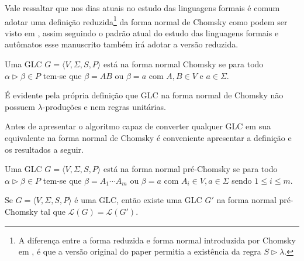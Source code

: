 Vale ressaltar que nos dias atuais no estudo das linguagens formais é comum adotar uma definição reduzida\footnote{A diferença entre a forma reduzida e forma normal introduzida por Chomsky em \cite{chomsky1959}, é que a versão original do paper permitia a existência da regra $S \rhd \lambda$.} da forma normal de Chomsky como podem ser visto em \cite{benjaLivro2010, hopcroft2008, menezes1998LFA}, assim seguindo o padrão atual do estudo das linguagens formais e autômatos esse manuscrito também irá adotar a versão reduzida.

\begin{definition}\label{def:NormalChomsky}
    Uma GLC $G = \langle V, \Sigma, S, P \rangle$ está na forma normal Chomsky se para todo $\alpha \rhd \beta \in P$ tem-se que $\beta = AB$ ou $\beta = a$ com $A, B \in V$ e $a \in \Sigma$.
\end{definition}

\begin{remark}
    É evidente pela própria definição que GLC na forma normal de Chomsky não possuem $\lambda$-produções e nem regras unitárias.
\end{remark}

Antes de apresentar o algoritmo capaz de converter qualquer GLC em sua equivalente na forma normal de Chomsky é conveniente apresentar a definição e os resultados a seguir.

\begin{definition}\label{def:NormalPreChomsky}
    Uma GLC $G = \langle V, \Sigma, S, P \rangle$ está na forma normal pré-Chomsky se para todo $\alpha \rhd \beta \in P$ tem-se que $\beta = A_1\cdots A_m$ ou $\beta = a$ com $A_i \in V, a \in \Sigma$ sendo $1 \leq i \leq m$.
\end{definition}

\begin{lemma}\label{lema:PreChomsky}
    Se $G = \langle V, \Sigma, S, P \rangle$ é uma GLC, então existe uma GLC $G'$ na forma normal pré-Chomsky tal que $\mathcal{L}(G) = \mathcal{L}(G')$.
\end{lemma}

